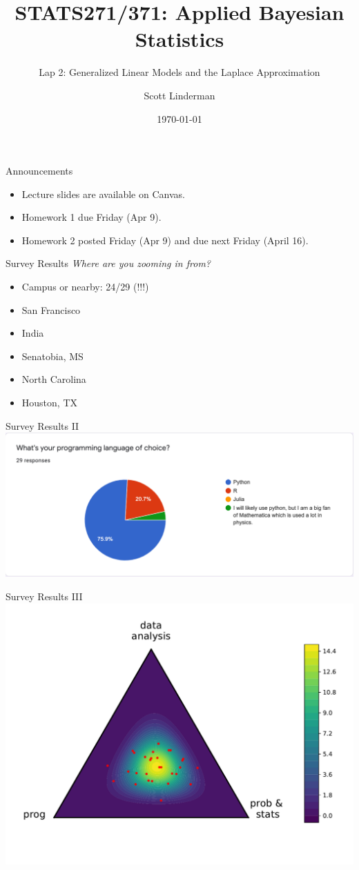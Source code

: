 \documentclass[aspectratio=169]{beamer}
\title{STATS271/371: Applied Bayesian Statistics}
\subtitle{Lap 2: Generalized Linear Models and the Laplace Approximation}
\author{Scott Linderman}
\date{\today}
\begin{document}
\maketitle


\begin{frame}{Announcements}

\begin{itemize}
    \item Lecture slides are available on Canvas.
    
    \item Homework 1 due Friday (Apr 9). 
    
    \item Homework 2 posted Friday (Apr 9) and due next Friday (April 16).
\end{itemize}
    
\end{frame}

\begin{frame}{Survey Results}
\textit{Where are you zooming in from?}
\begin{itemize}
    \item Campus or nearby: 24/29 (!!!)
    \item San Francisco
    \item India
    \item Senatobia, MS
    \item North Carolina
    \item Houston, TX
\end{itemize}
\end{frame}

\begin{frame}{Survey Results II}
\centering
\includegraphics[width=.9\textwidth]{figures/lap2/survey-pl.pdf}
\end{frame}

\begin{frame}{Survey Results III}
\centering
\includegraphics[width=.75\textwidth]{figures/lap2/survey.pdf}
\end{frame}
\end{document}
